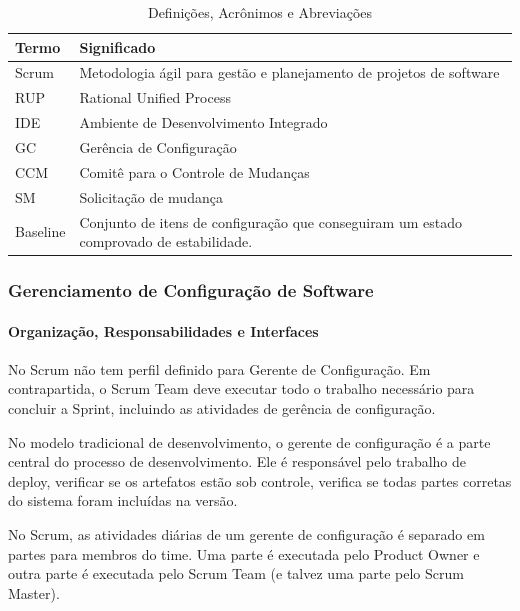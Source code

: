 \begin{table}[H]
      \begin{center}
        \begin{tabular}{| l | l |}
        \hline
        \textbf{Termo} & \textbf{Significado} \\ \hline
        Scrum & Metodologia ágil para gestão e planejamento de projetos de software \\ \hline
        RUP & Rational Unified Process \\ \hline
        IDE & Ambiente de Desenvolvimento Integrado \\ \hline
        GC & Gerência de Configuração \\ \hline
        CCM & Comitê para o Controle de Mudanças \\ \hline
        SM & Solicitação de mudança \\ \hline
        Baseline & Conjunto de itens de configuração que conseguiram um estado comprovado de estabilidade. \\ \hline
        \end{tabular}
      \end{center}
    \caption{Definições, Acrônimos e Abreviações}
    \end{table}

\subsubsection{Gerenciamento de Configuração de Software}

\paragraph{Organização, Responsabilidades e Interfaces} 

No Scrum não tem perfil definido para Gerente de Configuração. Em contrapartida, o Scrum Team deve executar todo o trabalho necessário para concluir a Sprint, incluindo as atividades de gerência de configuração.

No modelo tradicional de desenvolvimento, o gerente de configuração é a parte central do processo de desenvolvimento. Ele é responsável pelo trabalho de deploy, verificar se os artefatos estão sob controle, verifica se todas partes corretas do sistema foram incluídas na versão.

No Scrum, as atividades diárias de um gerente de configuração é separado em partes para membros do time. Uma parte é executada pelo Product Owner e outra parte é executada pelo Scrum Team (e talvez uma parte pelo Scrum Master).

